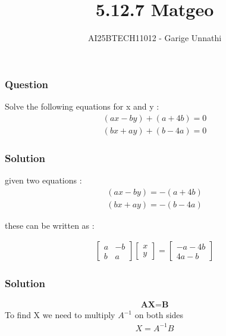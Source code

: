 \documentclass{beamer}
\title{5.12.7 Matgeo}
\author{AI25BTECH11012 - Garige Unnathi}
\date{}
\begin{document}
\frame{\titlepage}

\begin{frame}
\frametitle{Question}
 Solve the following equations for x and y :
 \begin{align*}
     (ax - by) + (a + 4b)= 0 \\
     (bx + ay) + (b - 4a)= 0
 \end{align*}
\end{frame}


\begin{frame}
\frametitle{Solution}
given two equations :
 \begin{align}
     (ax - by) =  -(a + 4b) \\
     (bx + ay) = -(b - 4a)
 \end{align}

 these can be written as :

 \begin{align}
     \begin{bmatrix}a & -b \\ b & a\end{bmatrix}\begin{bmatrix}x \\ y\end{bmatrix} = \begin{bmatrix}-a-4b \\ 4a -b\end{bmatrix}
 \end{align}
\end{frame}

\begin{frame}
\frametitle{Solution}
\begin{align}
    \textbf{A}\textbf{X} = \textbf{B}
\end{align}
To find X we need to multiply $A^{-1}$ on both sides
\begin{align}
   X =A^{-1}B
\end{align}
\end{frame}
\end{document}
